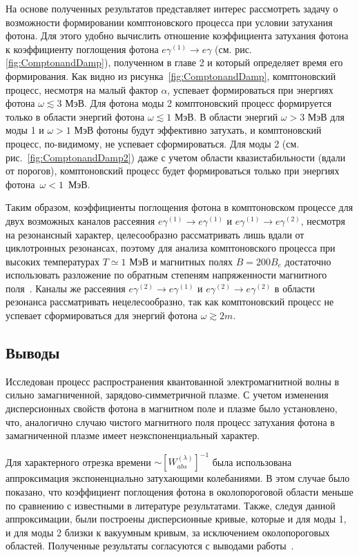На основе полученных результатов представляет интерес рассмотреть задачу о возможности формировании комптоновского процесса при условии затухания фотона. Для этого удобно вычислить отношение коэффициента затухания фотона к коэффициенту поглощения фотона $e\gamma^{(1)}\to e\gamma$  (см. рис. \ref{fig:ComptonandDamp}), полученном в главе 2 и который определяет время его формирования. Как видно из рисунка~\ref{fig:ComptonandDamp}, комптоновский процесс, несмотря на малый фактор $\alpha$, успевает формироваться при энергиях фотона $\omega\lesssim3$ МэВ. Для фотона моды 2 комптоновский процесс формируется только в области энергий фотона $\omega\lesssim1$ МэВ. В области энергий $\omega>3$ МэВ для моды 1 и $\omega>1$ МэВ фотоны будут эффективно затухать, и комптоновский процесс, по-видимому, не успевает сформироваться. Для моды 2 (см. рис.~\ref{fig:ComptonandDamp2}) даже с учетом области квазистабильности (вдали от порогов), комптоновский процесс будет формироваться только при энергиях фотона~$\omega<1$~МэВ.

Таким образом, коэффициенты поглощения фотона в комптоновском процессе для двух возможных каналов рассеяния $e\gamma^{(1)}  \to e\gamma^{(1)}$ и $e\gamma^{(1)}  \to e\gamma^{(2)}$, несмотря на резонансный характер, целесообразно рассматривать лишь вдали от циклотронных резонансах, поэтому для анализа комптоновского процесса при высоких температурах $T\simeq 1$ МэВ и магнитных полях $B=200 B_e$ достаточно использовать разложение по обратным степеням напряженности магнитного поля~\cite{Chistyakov:2009}. Каналы же рассеяния $e\gamma^{(2)}  \to e\gamma^{(1)}$  и $e\gamma^{(2)}  \to e\gamma^{(2)}$ в области резонанса рассматривать нецелесообразно, так как комптоновский процесс не успевает сформироваться для энергий фотона $\omega\gtrsim 2m$.

\newpage

\subsection{Выводы}
Исследован процесс распространения квантованной электромагнитной волны в сильно замагниченной, зарядово-симметричной плазме. С учетом изменения дисперсионных свойств фотона в магнитном поле и плазме было установлено, что, аналогично случаю чистого магнитного поля процесс затухания фотона
в замагниченной плазме имеет неэкспоненциальный характер. 

Для характерного отрезка времени $\sim [W^{{(\lambda)}}_{abs}]^{-1}$ была использована аппроксимация экспоненциально затухающими колебаниями. В этом случае было
показано, что коэффициент поглощения фотона в околопороговой области меньше по сравнению с известными в литературе результатами. Также, следуя данной аппроксимации, были построены дисперсионные кривые, которые и для моды 1, и для моды 2 близки к вакуумным кривым, за исключением околопороговых областей. Полученные результаты согласуются с выводами работы~\cite{Shabad:1988}.

